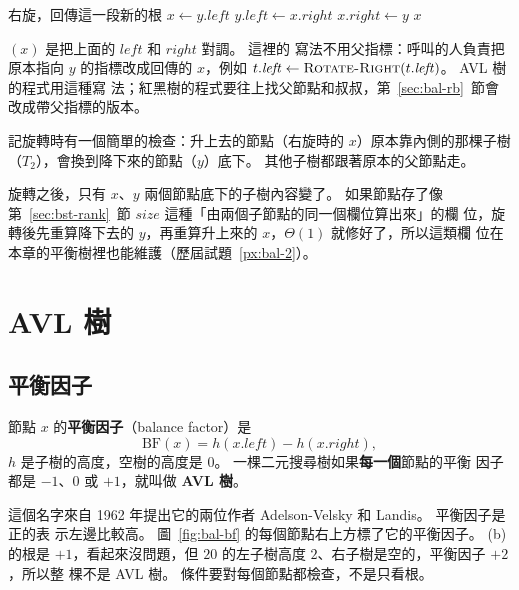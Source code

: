 \begin{pseudo}[label=alg:bal-rotate-right]{右旋，回傳這一段新的根}
    \State $x \gets y.\mathit{left}$
    \State $y.\mathit{left} \gets x.\mathit{right}$ 
    \State $x.\mathit{right} \gets y$
    \State \Return $x$
\EndFunction
\end{pseudo}

$(x)$ 是把上面的 $\mathit{left}$ 和 $\mathit{right}$ 對調。 這裡的
寫法不用父指標：呼叫的人負責把原本指向 $y$ 的指標改成回傳的 $x$，例如
$t.\mathit{left} \gets \proc{Rotate-Right}(t.\mathit{left})$。 AVL 樹的程式用這種寫
法；紅黑樹的程式要往上找父節點和叔叔，第~\ref{sec:bal-rb}~節會改成帶父指標的版本。

記旋轉時有一個簡單的檢查：升上去的節點（右旋時的 $x$）原本靠內側的那棵子樹
（$T_2$），會換到降下來的節點（$y$）底下。 其他子樹都跟著原本的父節點走。

旋轉之後，只有 $x$、$y$ 兩個節點底下的子樹內容變了。 如果節點存了像
第~\ref{sec:bst-rank}~節 $\mathit{size}$ 這種「由兩個子節點的同一個欄位算出來」的欄
位，旋轉後先重算降下去的 $y$，再重算升上來的 $x$，$\Theta(1)$ 就修好了，所以這類欄
位在本章的平衡樹裡也能維護（歷屆試題~\ref{px:bal-2}）。

\section{AVL 樹}
\label{sec:bal-avl}

\subsection{平衡因子}

\begin{definition}[AVL 樹]
\label{def:bal-avl}
節點 $x$ 的\textbf{平衡因子}（balance factor）是
\[
\mathrm{BF}(x) = h(x.\mathit{left}) - h(x.\mathit{right}),
\]
$h$ 是子樹的高度，空樹的高度是 $0$。 一棵二元搜尋樹如果\textbf{每一個}節點的平衡
因子都是 $-1$、$0$ 或 $+1$，就叫做 \textbf{AVL 樹}。
\end{definition}

這個名字來自 1962 年提出它的兩位作者 Adelson-Velsky 和 Landis。 平衡因子是正的表
示左邊比較高。 圖~\ref{fig:bal-bf} 的每個節點右上方標了它的平衡因子。 (b) 的根是
$+1$，看起來沒問題，但 $20$ 的左子樹高度 $2$、右子樹是空的，平衡因子 $+2$，所以整
棵不是 AVL 樹。 條件要對每個節點都檢查，不是只看根。

